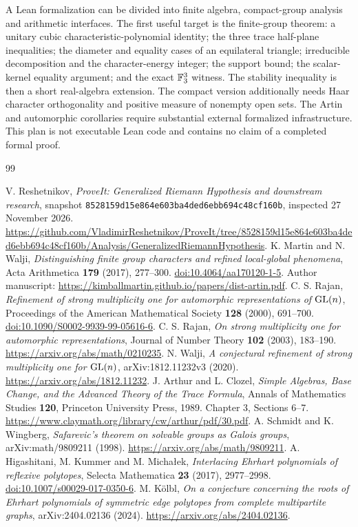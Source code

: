 \documentclass[11pt]{article}
\theoremstyle{definition}\newtheorem{definition}[theorem]{Definition}
\theoremstyle{remark}\newtheorem{remark}[theorem]{Remark}
\begin{document}
A Lean formalization can be divided into finite algebra, compact-group analysis and arithmetic interfaces. The first useful target is the finite-group theorem: a unitary cubic characteristic-polynomial identity; the three trace half-plane inequalities; the diameter and equality cases of an equilateral triangle; irreducible decomposition and the character-energy integer; the support bound; the scalar-kernel equality argument; and the exact $\mathbb F_3^3$ witness. The stability inequality is then a short real-algebra extension. The compact version additionally needs Haar character orthogonality and positive measure of nonempty open sets. The Artin and automorphic corollaries require substantial external formalized infrastructure. This plan is not executable Lean code and contains no claim of a completed formal proof.

\begin{thebibliography}{99}
\raggedright
{} V. Reshetnikov, \emph{ProveIt: Generalized Riemann Hypothesis and downstream research}, snapshot \texttt{8528159d15e864e603ba4ded6ebb694c48cf160b}, inspected 27 November 2026. \url{https://github.com/VladimirReshetnikov/ProveIt/tree/8528159d15e864e603ba4ded6ebb694c48cf160b/Analysis/GeneralizedRiemannHypothesis}.
 K. Martin and N. Walji, \emph{Distinguishing finite group characters and refined local-global phenomena}, Acta Arithmetica \textbf{179} (2017), 277--300. \href{https://doi.org/10.4064/aa170120-1-5}{doi:10.4064/aa170120-1-5}. Author manuscript: \url{https://kimballmartin.github.io/papers/dist-artin.pdf}.
 C. S. Rajan, \emph{Refinement of strong multiplicity one for automorphic representations of $\mathrm{GL}(n)$}, Proceedings of the American Mathematical Society \textbf{128} (2000), 691--700. \href{https://doi.org/10.1090/S0002-9939-99-05616-6}{doi:10.1090/S0002-9939-99-05616-6}.
 C. S. Rajan, \emph{On strong multiplicity one for automorphic representations}, Journal of Number Theory \textbf{102} (2003), 183--190. \url{https://arxiv.org/abs/math/0210235}.
 N. Walji, \emph{A conjectural refinement of strong multiplicity one for $\mathrm{GL}(n)$}, arXiv:1812.11232v3 (2020). \url{https://arxiv.org/abs/1812.11232}.
 J. Arthur and L. Clozel, \emph{Simple Algebras, Base Change, and the Advanced Theory of the Trace Formula}, Annals of Mathematics Studies \textbf{120}, Princeton University Press, 1989. Chapter 3, Sections 6--7. \url{https://www.claymath.org/library/cw/arthur/pdf/30.pdf}.
 A. Schmidt and K. Wingberg, \emph{Safarevic's theorem on solvable groups as Galois groups}, arXiv:math/9809211 (1998). \url{https://arxiv.org/abs/math/9809211}.
 A. Higashitani, M. Kummer and M. Micha\l ek, \emph{Interlacing Ehrhart polynomials of reflexive polytopes}, Selecta Mathematica \textbf{23} (2017), 2977--2998. \href{https://doi.org/10.1007/s00029-017-0350-6}{doi:10.1007/s00029-017-0350-6}.
 M. K\"olbl, \emph{On a conjecture concerning the roots of Ehrhart polynomials of symmetric edge polytopes from complete multipartite graphs}, arXiv:2404.02136 (2024). \url{https://arxiv.org/abs/2404.02136}.
\end{thebibliography}
\end{document}
